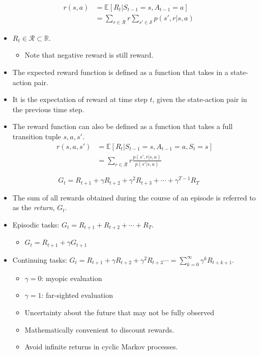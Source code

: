 \begin{definition}
	\begin{align*}
		r(s,a)&= \mathbb{E}[R_t|S_{t-1}=s,A_{t-1}=a]\\
		&= \sum_{r\in \mathcal{R}}r\sum_{s'\in \mathcal{S}}p(s',r|s,a)
	\end{align*}
\end{definition}
\begin{itemize}
	\item $R_t\in \mathcal{R} \subset \mathbb{R}.$ 
		\begin{itemize}
			\item Note that negative reward is still reward.
		\end{itemize}
	\item The expected reward function is defined as a function that takes in a state-action pair.
	\item It is the expectation of reward at time step $t$, given the state-action pair in the previous time step.
	\item The reward function can also be defined as a function that takes a full transition tuple $s,a,s'$.
		\begin{align*}
			r(s,a,s')&= \mathbb{E}[R_t|S_{t-1}=s,A_{t-1}=a,S_{t}=s]\\
			&= \sum_{r\in \mathcal{R}}r\frac{p(s',r|s,a)}{p(s'|s,a)}
		\end{align*}
\end{itemize}

\begin{definition}
	$$G_t = R_{t+1}+\gamma R_{t+2}+\gamma^2 R_{t+3}+\cdots+\gamma^{T-1} R_{T} $$
\end{definition}

\begin{itemize}
	\item The sum of all rewards obtained during the course of an episode is referred to as the \textit{return}, $G_t$.
	\item Episodic tasks: $G_t = R_{t+1} + R_{t+2} + \cdots + R_{T}.$
		\begin{itemize}
			\item $G_t = R_{t+1}+\gamma G_{t+1}$
		\end{itemize}
	\item Continuing tasks: $G_t = R_{t+1} + \gamma R_{t+2} +  \gamma^2 R_{t+3} \cdots =\sum_{k=0}^{\infty} \gamma^{k} R_{t+k+1}.$
		\begin{itemize}
			\item $\gamma=0$: myopic evaluation
			\item $\gamma=1$: far-sighted evaluation
			\item Uncertainty about the future that may not be fully observed
			\item Mathematically convenient to discount rewards. 
			\item Avoid infinite returns in cyclic Markov processes.
		\end{itemize}
\end{itemize}

